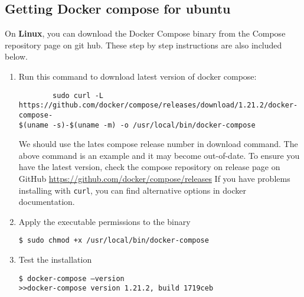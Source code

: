 \subsection{Getting Docker compose for ubuntu}
On \textbf{Linux}, you can download the Docker Compose binary from the Compose repository page on git
hub. These step by step instructions are also included below.
\begin{enumerate}
	\item Run this command to download latest version of docker compose:
		\begin{center}
		\begin{verbatim}
		sudo curl -L
https://github.com/docker/compose/releases/download/1.21.2/docker-compose-
$(uname -s)-$(uname -m) -o /usr/local/bin/docker-compose
		\end{verbatim}
		\end{center}
		We should use the lates compose release number in download command. The above command is an example and it may become out-of-date. To ensure you have the latest version, check the compose repository on release page on GitHub \url{https://github.com/docker/compose/releases}
		\newline If you have problems installing with \verb=curl=, you can find alternative options in docker documentation.
	\item Apply the executable permissions to the binary\newline\begin{center}\verb=$ sudo chmod +x /usr/local/bin/docker-compose=\end{center}
	\item Test the installation
		\begin{center}
		\begin{verbatim}
$ docker-compose –version
>>docker-compose version 1.21.2, build 1719ceb
		\end{verbatim}
		\end{center}
\end{enumerate}

